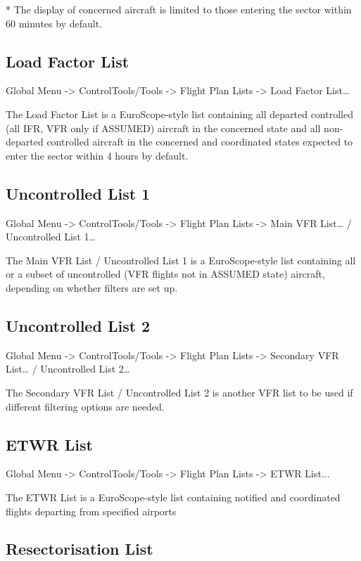 \documentclass[11pt,a4paper,oldfontcommands]{memoir}
\begin{document}
* The display of concerned aircraft is limited to those entering the sector within 60 minutes by default.

\subsection{Load Factor List}
\label{list:load}

Global Menu -> ControlTools/Tools -> Flight Plan Lists -> Load Factor List…

The Load Factor List is a EuroScope-style list containing all departed controlled (all IFR, VFR only if ASSUMED) aircraft in the concerned state and all non-departed controlled aircraft in the concerned and coordinated states expected to enter the sector within 4 hours by default.

\subsection{Uncontrolled List 1}
\label{list:uncon1}

Global Menu -> ControlTools/Tools -> Flight Plan Lists -> Main VFR List… / Uncontrolled List 1…

The Main VFR List / Uncontrolled List 1 is a EuroScope-style list containing all or a subset of uncontrolled (VFR flights not in ASSUMED state) aircraft, depending on whether filters are set up.

\subsection{Uncontrolled List 2}
\label{list:uncon2}

Global Menu -> ControlTools/Tools -> Flight Plan Lists -> Secondary VFR List… / Uncontrolled List 2…

The Secondary VFR List / Uncontrolled List 2 is another VFR list to be used if different filtering options are needed.

\subsection{ETWR List}
\label{list:etwr}

Global Menu -> ControlTools/Tools -> Flight Plan Lists -> ETWR List...

The ETWR List is a EuroScope-style list containing notified and coordinated flights departing from specified airports

\subsection{Resectorisation List}
\label{list:resec}
\end{document}
